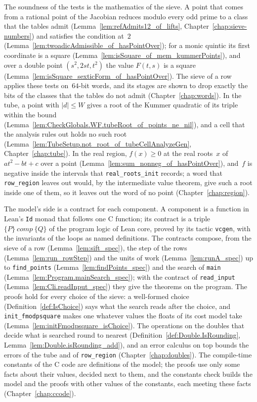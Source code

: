 The soundness of the tests is the mathematics of the sieve. A point that comes from a rational point
of the Jacobian reduces modulo every odd prime to a class that the tables admit
(Lemma~\ref{lem:refAdmits12_of_lifts}, Chapter~\ref{chap:sieve-numbers}) and satisfies the condition
at~$2$ (Lemma~\ref{lem:twoadicAdmissible_of_hasPointOver}); for a monic quintic its first coordinate
is a square (Lemma~\ref{lem:isSquare_of_mem_kummerPoints}), and over a double point $(s^2, 2st,
t^2)$ the value $F(t, s)$ is a square (Lemma~\ref{lem:isSquare_sexticForm_of_hasPointOver}). The
sieve of a row applies these tests on~$64$-bit words, and its stages are shown to drop exactly the
bits of the classes that the tables do not admit (Chapter~\ref{chap:words}). In the tube, a point
with $|d| \le W$ gives a root of the Kummer quadratic of its triple within the bound
(Lemma~\ref{lem:CheckGlobals.WF.tubeRoot_of_points_ne_nil}), and a cell that the analysis rules out
holds no such root (Lemma~\ref{lem:TubeSetup.not_root_of_tubeCellAnalyzeGen},
Chapter~\ref{chap:tube}). In the real region, $f(x) \ge 0$ at the real roots~$x$ of $a t^2 - b t +
c$ over a point (Lemma~\ref{lem:sum_nonneg_of_hasPointOver}), and~$f$ is negative inside the
intervals that \texttt{real\_roots\_init} records; a word that \texttt{row\_region} leaves out
would, by the intermediate value theorem, give such a root inside one of them, so it leaves out the
word of no point (Chapter~\ref{chap:region}).

The model's side is a contract for each component. A component is a function in Lean's \verb|Id|
monad that follows one C function; its contract is a triple $\{P\}\ \mathit{comp}\ \{Q\}$ of the
program logic of Lean core, proved by its tactic \verb|vcgen|, with the invariants of the loops as
named definitions. The contracts compose, from the sieve of a row (Lemma~\ref{lem:sift_spec}), the
step of the rows (Lemma~\ref{lem:run_rowStep}) and the units of work (Lemma~\ref{lem:runA_spec}) up
to \texttt{find\_points} (Lemma~\ref{lem:findPoints_spec}) and the search of \texttt{main}
(Lemma~\ref{lem:Program.mainSearch_spec}); with the contract of \texttt{read\_input}
(Lemma~\ref{lem:Cli.readInput_spec}) they give the theorems on the program. The proofs hold for
every choice of the sieve: a well-formed choice (Definition~\ref{def:IsChoice}) says what the search
reads after the choice, and \texttt{init\_fmodpsquare} makes one whatever values the floats of its
cost model take (Lemma~\ref{lem:initFmodpsquare_isChoice}). The operations on the doubles that
decide what is searched round to nearest (Definition~\ref{def:Double.IsRounding},
Lemma~\ref{lem:Double.isRounding_add}), and an error calculus on top bounds the errors of the tube
and of \texttt{row\_region} (Chapter~\ref{chap:doubles}). The compile-time constants of the C code
are definitions of the model; the proofs use only some facts about their values, decided next to
them, and the constants check builds the model and the proofs with other values of the constants,
each meeting these facts (Chapter~\ref{chap:ccode}).

